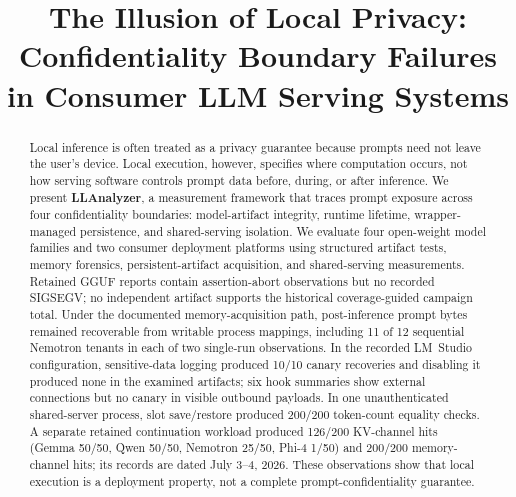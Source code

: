 \documentclass[journal,tifs]{IEEEtran}
\begin{document}
    \title{The Illusion of Local Privacy:
Confidentiality Boundary Failures in Consumer LLM Serving Systems}

\author{}
	\maketitle
	\begin{abstract}

Local inference is often treated as a privacy guarantee because prompts need not leave the user's device. Local execution, however, specifies where computation occurs, not how serving software controls prompt data before, during, or after inference. We present \textbf{LLAnalyzer}, a measurement framework that traces prompt exposure across four confidentiality boundaries: model-artifact integrity, runtime lifetime, wrapper-managed persistence, and shared-serving isolation. We evaluate four open-weight model families and two consumer deployment platforms using structured artifact tests, memory forensics, persistent-artifact acquisition, and shared-serving measurements. Retained GGUF reports contain assertion-abort observations but no recorded SIGSEGV; no independent artifact supports the historical coverage-guided campaign total. Under the documented memory-acquisition path, post-inference prompt bytes remained recoverable from writable process mappings, including 11 of 12 sequential Nemotron tenants in each of two single-run observations. In the recorded LM~Studio configuration, sensitive-data logging produced 10/10 canary recoveries and disabling it produced none in the examined artifacts; six hook summaries show external connections but no canary in visible outbound payloads. In one unauthenticated shared-server process, slot save/restore produced 200/200 token-count equality checks. A separate retained continuation workload produced 126/200 KV-channel hits (Gemma 50/50, Qwen 50/50, Nemotron 25/50, Phi-4 1/50) and 200/200 memory-channel hits; its records are dated July 3--4, 2026. These observations show that local execution is a deployment property, not a complete prompt-confidentiality guarantee.

\end{abstract}
\end{document}
